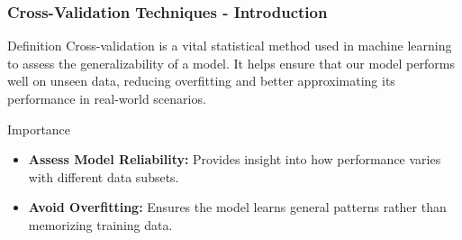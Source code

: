 \documentclass[aspectratio=169]{beamer}
\begin{document}
\begin{frame}[fragile]
    \frametitle{Cross-Validation Techniques - Introduction}
    \begin{block}{Definition}
        Cross-validation is a vital statistical method used in machine learning to assess the generalizability of a model. 
        It helps ensure that our model performs well on unseen data, reducing overfitting and better approximating its performance in real-world scenarios.
    \end{block}
    
    \begin{block}{Importance}
        \begin{itemize}
            \item \textbf{Assess Model Reliability:} Provides insight into how performance varies with different data subsets.
            \item \textbf{Avoid Overfitting:} Ensures the model learns general patterns rather than memorizing training data.
        \end{itemize}
    \end{block}
\end{frame}
\end{document}
